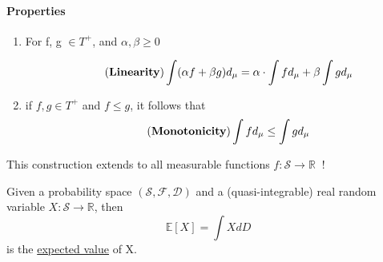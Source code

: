\documentclass[10pt,a4paper]{article}
\theoremstyle{definition}
\theoremstyle{plain}
\begin{document}
\paragraph{Properties} 
\begin{enumerate}
	\item For f, g $\in T^+$, and $\alpha, \beta \geq 0$ 
	
	\begin{equation}
		\tag{\textbf{Linearity}}
	 	\int (\alpha f + \beta g)d_\mu = \alpha \cdot \int fd_\mu + \beta \int gd_\mu
	 \end{equation}
	\item  if $f, g \in T^+$ and $ f \leq g$, it follows that 
	\begin{equation}
		\tag{\textbf{Monotonicity}}
		\int fd_\mu \leq \int gd_\mu
	\end{equation}
\end{enumerate}
This construction extends to all measurable functions $f:\mathcal{ S}\to \mathbb{R}\ $ !

\begin{boxeddef}
	Given a probability space $\mathcal{(S, F, D)}$ and a (quasi-integrable) real random variable $X: \mathcal{S} \to \mathbb{R}$, then
	$$ \mathbb{E}[X] = \int XdD$$
	is the \underline{expected value} of X.
\end{boxeddef}
\end{document}
